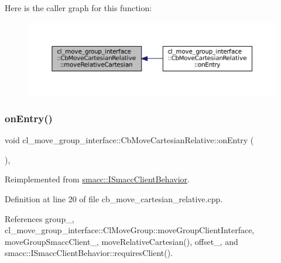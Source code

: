 Here is the caller graph for this function\+:
\nopagebreak
\begin{figure}[H]
\begin{center}
\leavevmode
\includegraphics[width=350pt]{classcl__move__group__interface_1_1CbMoveCartesianRelative_ae8443c7f81affe5c4450e83fc665487f_icgraph}
\end{center}
\end{figure}
\mbox{\label{classcl__move__group__interface_1_1CbMoveCartesianRelative_a7d65e3d5fa3f2c7b47d9cbe631f448ad}} 
\subsubsection{\texorpdfstring{on\+Entry()}{onEntry()}}
{\footnotesize\ttfamily void cl\+\_\+move\+\_\+group\+\_\+interface\+::\+Cb\+Move\+Cartesian\+Relative\+::on\+Entry (\begin{DoxyParamCaption}{ }\end{DoxyParamCaption})\hspace{0.3cm}{\ttfamily [override]}, {\ttfamily [virtual]}}



Reimplemented from \hyperlink{classsmacc_1_1ISmaccClientBehavior_a3ec24a839087c550e1d62a81e48cf530}{smacc\+::\+I\+Smacc\+Client\+Behavior}.



Definition at line 20 of file cb\+\_\+move\+\_\+cartesian\+\_\+relative.\+cpp.



References group\+\_\+, cl\+\_\+move\+\_\+group\+\_\+interface\+::\+Cl\+Move\+Group\+::move\+Group\+Client\+Interface, move\+Group\+Smacc\+Client\+\_\+, move\+Relative\+Cartesian(), offset\+\_\+, and smacc\+::\+I\+Smacc\+Client\+Behavior\+::requires\+Client().


